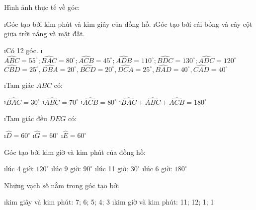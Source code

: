 \begin{Answer}{39}
		Hình ảnh thực tế về góc:
		\begin{enumerate}[+,leftmargin=*]
			\i Góc tạo bởi kim phút và kim giây của đồng hồ.
			\i Góc tạo bởi cái bóng và cây cột giữa trời nắng và mặt đất.
		\end{enumerate}
	
\end{Answer}
\begin{Answer}{40}
		\begin{enumerate}[a),leftmargin=*]
			\i Có 12 góc.
			\i $\widehat{ABC}={{55}^\circ};\widehat{BAC}={{80}^\circ};\widehat{ACB}={{45}^\circ};\widehat{ADB}={{110}^\circ};\widehat{BDC}={{130}^\circ};\widehat{ADC}={{120}^\circ}$
			$\widehat{CBD}={{25}^\circ},\widehat{DBA}={{20}^\circ},\widehat{BCD}={{20}^\circ},\widehat{DCA}={{25}^\circ},\widehat{BAD}={{40}^\circ},\widehat{CAD}={{40}^\circ}$
		\end{enumerate}
	
\end{Answer}
\begin{Answer}{41}
		\begin{enumerate}[a),leftmargin=*]
			\i Tam giác $ABC$ có:
			\begin{enumerate}[--,leftmargin=*]
				\i $\widehat{BAC}={{30}^\circ}$
				\i $\widehat{ABC}={{70}^\circ}$
				\i $\widehat{ACB}={{80}^\circ}$
				\i $\widehat{BAC}+\widehat{ABC}+\widehat{ACB}={{180}^\circ}$
			\end{enumerate}
			\i Tam giác đều $DEG$ có:
			\begin{enumerate}[--,leftmargin=*]
				\i $\widehat{D}={{60}^\circ}$
				\i $\widehat{G}={{60}^\circ}$
				\i $\widehat{E}={{60}^\circ}$
			\end{enumerate}
		\end{enumerate}
	
\end{Answer}
\begin{Answer}{42}
		Góc tạo bởi kim giờ và kim phút của đồng hồ:
		\begin{enumerate}[--,leftmargin=*]
			\i lúc 4 giờ: ${{120}^\circ}$
			\i lúc 9 giờ: ${{90}^\circ}$
			\i lúc 11 giờ: ${{30}^\circ}$
			\i lúc 6 giờ: ${{180}^\circ}$
		\end{enumerate}
	
\end{Answer}
\begin{Answer}{43}
		Những vạch số nằm trong góc tạo bởi
		\begin{enumerate}[a),leftmargin=*]
			\i kim giây và kim phút: 7; 6; 5; 4; 3
			\i kim giờ và kim phút: 11; 12; 1; 1
		\end{enumerate}
	
\end{Answer}
